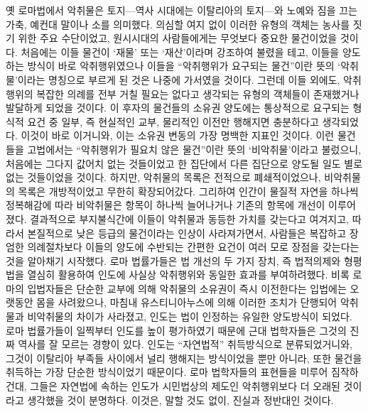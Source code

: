 옛 로마법에서 악취물은 토지---역사 시대에는 이탈리아의 토지---와
노예와 짐을 끄는 가축, 예컨대 말이나 소를 의미했다.
의심할 여지 없이 이러한 유형의 객체는 농사를 짓기 위한 주요 수단이었고,
원시시대의 사람들에게는 무엇보다 중요한 물건이었을 것이다.
처음에는 이들 물건이 `재물' 또는 `재산'이라며 강조하여 불렸을 테고,
이들을 양도하는 방식이 바로 악취행위였으나
이들을 ``악취행위가 요구되는 물건''이란 뜻의
`악취물'이라는 명칭으로 부르게 된 것은 나중에 가서였을 것이다.
그런데 이들 외에도,
악취행위의 복잡한 의례를 전부 거칠 필요는 없다고 생각되는
유형의 객체들이 존재했거나 발달하게 되었을 것이다.
이 후자의 물건들의 소유권 양도에는
통상적으로 요구되는 형식적 요건 중 일부,
즉 현실적인 교부, 물리적인 이전만 행해지면 충분하다고 생각되었다.
이것이 바로 이거니와,
이는 소유권 변동의 가장 명백한 지표인 것이다.
이런 물건들을 고법에서는
``악취행위가 필요치 않은 물건''이란 뜻의
`비악취물'이라고 불렀으니,
처음에는 그다지 값어치 없는 것들이었고
한 집단에서 다른 집단으로 양도될 일도 별로 없는 것들이었을 것이다.
하지만, 악취물의 목록은 전적으로 폐쇄적이었으나,
비악취물의 목록은 개방적이었고 무한히 확장되어갔다.
그리하여 인간이 물질적 자연을 하나씩 정복해감에 따라
비악취물은 항목이 하나씩 늘어나거나
기존의 항목에 개선이 이루어졌다.
결과적으로 부지불식간에
이들이 악취물과 동등한 가치를 갖는다고 여겨지고, 따라서
본질적으로 낮은 등급의 물건이라는 인상이 사라져가면서,
사람들은 복잡하고 장엄한 의례절차보다
이들의 양도에 수반되는 간편한 요건이 여러 모로 장점을 갖는다는 것을
알아채기 시작했다.
로마 법률가들은
법 개선의 두 가지 장치,
즉 법적의제와 형평법을
열심히 활용하여
인도에 사실상 악취행위와 동일한 효과를 부여하려했다.
비록 로마의 입법자들은
단순한 교부에 의해
악취물의 소유권이
즉시 이전한다는 입법에는
오랫동안 몸을 사려왔으나,
마침내 유스티니아누스에 의해 이러한 조치가 단행되어
악취물과 비악취물의 차이가 사라졌고,
인도는 법이 인정하는 유일한 양도방식이 되었다.
로마 법률가들이 일찍부터
인도를 높이 평가하였기 때문에
근대 법학자들은 그것의 진짜 역사를 잘 모르는 경향이 있다.
인도는 ``자연법적'' 취득방식으로 분류되었거니와,
그것이 이탈리아 부족들 사이에서 널리 행해지는 방식이었을 뿐만 아니라,
또한 물건을 취득하는 가장 단순한 방식이었기 때문이다.
로마 법학자들의 표현들을 미루어 짐작하건대,
그들은 자연법에 속하는 인도가 시민법상의 제도인 악취행위보다
더 오래된 것이라고 생각했을 것이 분명하다.
이것은, 말할 것도 없이, 진실과 정반대인 것이다.

